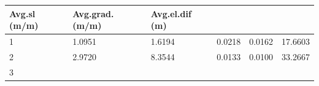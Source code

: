 \documentclass[11pt,]{article}
\begin{document}
\begin{longtable}[]{@{}llllll@{}}
\begin{minipage}[b]{0.13\columnwidth}
Avg.sl (m/m)\strut
\end{minipage} & \begin{minipage}[b]{0.16\columnwidth}\raggedright\strut
Avg.grad. (m/m)\strut
\end{minipage} & \begin{minipage}[b]{0.15\columnwidth}\raggedright\strut
Avg.el.dif (m)\strut
\end{minipage}\tabularnewline
\midrule
\endhead
\begin{minipage}[t]{0.12\columnwidth}\raggedright\strut
1\strut
\end{minipage} & \begin{minipage}[t]{0.13\columnwidth}\raggedright\strut
1.0951\strut
\end{minipage} & \begin{minipage}[t]{0.13\columnwidth}\raggedright\strut
1.6194\strut
\end{minipage} & \begin{minipage}[t]{0.13\columnwidth}\raggedright\strut
0.0218\strut
\end{minipage} & \begin{minipage}[t]{0.16\columnwidth}\raggedright\strut
0.0162\strut
\end{minipage} & \begin{minipage}[t]{0.15\columnwidth}\raggedright\strut
17.6603\strut
\end{minipage}\tabularnewline
\begin{minipage}[t]{0.12\columnwidth}\raggedright\strut
2\strut
\end{minipage} & \begin{minipage}[t]{0.13\columnwidth}\raggedright\strut
2.9720\strut
\end{minipage} & \begin{minipage}[t]{0.13\columnwidth}\raggedright\strut
8.3544\strut
\end{minipage} & \begin{minipage}[t]{0.13\columnwidth}\raggedright\strut
0.0133\strut
\end{minipage} & \begin{minipage}[t]{0.16\columnwidth}\raggedright\strut
0.0100\strut
\end{minipage} & \begin{minipage}[t]{0.15\columnwidth}\raggedright\strut
33.2667\strut
\end{minipage}\tabularnewline
\begin{minipage}[t]{0.12\columnwidth}\raggedright\strut
3\strut
\end{minipage} & \begin{minipage}[t]{0.13\columnwidth}\raggedright\strut

\end{minipage}
\end{longtable}
\end{document}
